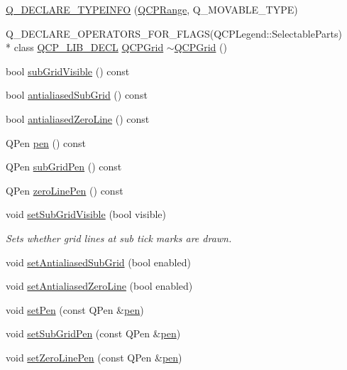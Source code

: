 \begin{DoxyCompactItemize}
\hyperlink{a00116_aed23afce99cb2c82db7540026f3b7af3}{Q\+\_\+\+D\+E\+C\+L\+A\+R\+E\+\_\+\+T\+Y\+P\+E\+I\+N\+F\+O} (\hyperlink{a00049}{Q\+C\+P\+Range}, Q\+\_\+\+M\+O\+V\+A\+B\+L\+E\+\_\+\+T\+Y\+P\+E)
\item 
Q\+\_\+\+D\+E\+C\+L\+A\+R\+E\+\_\+\+O\+P\+E\+R\+A\+T\+O\+R\+S\+\_\+\+F\+O\+R\+\_\+\+F\+L\+A\+G\+S(Q\+C\+P\+Legend\+::\+Selectable\+Parts) \\*
class \hyperlink{a00116_a5eaab02224a642ded7fb8951e973a02c}{Q\+C\+P\+\_\+\+L\+I\+B\+\_\+\+D\+E\+C\+L} \hyperlink{a00030_de/df3/a00185}{Q\+C\+P\+Grid} \hyperlink{a00116_acf10d80f45e1be1fe8f7b84210228a4c}{$\sim$\+Q\+C\+P\+Grid} ()
\item 
bool \hyperlink{a00116_a54d7af5eaca1b67a430434e5cde65ef1}{sub\+Grid\+Visible} () const 
\item 
bool \hyperlink{a00116_a84e73e80abc4ae19b0fb9ff5ddf51b00}{antialiased\+Sub\+Grid} () const 
\item 
bool \hyperlink{a00116_a31061cea98ee532cb4ebe1eb072d2ab3}{antialiased\+Zero\+Line} () const 
\item 
Q\+Pen \hyperlink{a00116_a1f13fffa0a0faac34ec342973e613a4a}{pen} () const 
\item 
Q\+Pen \hyperlink{a00116_ab370d307e2e1dab54e5f25349142fa63}{sub\+Grid\+Pen} () const 
\item 
Q\+Pen \hyperlink{a00116_a08f99e4e1b551da7fc7dc549e4559496}{zero\+Line\+Pen} () const 
\item 
void \hyperlink{a00116_ad4ad6bf714ec45e08845456355a1b700}{set\+Sub\+Grid\+Visible} (bool visible)
\begin{DoxyCompactList}\small\item\em Sets whether grid lines at sub tick marks are drawn. \end{DoxyCompactList}\item 
void \hyperlink{a00116_ad8224d578ae67548d765a22b2bf95f6c}{set\+Antialiased\+Sub\+Grid} (bool enabled)
\item 
void \hyperlink{a00116_abd1e85b9a9ee63be5e4113709326d061}{set\+Antialiased\+Zero\+Line} (bool enabled)
\item 
void \hyperlink{a00116_a499165f4744b6d22da7b24295910fb2c}{set\+Pen} (const Q\+Pen \&\hyperlink{a00116_a1f13fffa0a0faac34ec342973e613a4a}{pen})
\item 
void \hyperlink{a00116_a48c20da07dee569fc3acae82c9278fa7}{set\+Sub\+Grid\+Pen} (const Q\+Pen \&\hyperlink{a00116_a1f13fffa0a0faac34ec342973e613a4a}{pen})
\item 
void \hyperlink{a00116_a03ce49d4768a12a2f05fa292880d10e4}{set\+Zero\+Line\+Pen} (const Q\+Pen \&\hyperlink{a00116_a1f13fffa0a0faac34ec342973e613a4a}{pen})

\end{DoxyCompactItemize}
